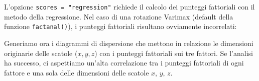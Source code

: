 \documentclass[
  11pt,
]{krantz}
\makeatletter
\newenvironment{Shaded}{\begin{snugshade}}{\end{snugshade}}
\newcommand{\CommentTok}[1]{\textcolor[rgb]{0.37,0.37,0.37}{\textit{#1}}}
\newcommand{\DecValTok}[1]{\textcolor[rgb]{0.06,0.06,0.06}{#1}}
\newcommand{\FunctionTok}[1]{\textcolor[rgb]{0,0,0}{#1}}
\newcommand{\NormalTok}[1]{#1}
\newcommand{\SpecialCharTok}[1]{\textcolor[rgb]{0,0,0}{#1}}
\newenvironment{kframe}{%
\medskip{}
\setlength{\fboxsep}{.8em}
 \def\at@end@of@kframe{}%
 \ifinner\ifhmode%
  \def\at@end@of@kframe{\end{minipage}}%
  \begin{minipage}{\columnwidth}%
 \fi\fi%
 \def\FrameCommand##1{\hskip\@totalleftmargin \hskip-\fboxsep
 \colorbox{shadecolor}{##1}\hskip-\fboxsep
     \hskip-\linewidth \hskip-\@totalleftmargin \hskip\columnwidth}%
 \MakeFramed {\advance\hsize-\width
   \@totalleftmargin\z@ \linewidth\hsize
   \@setminipage}}%
 {\par\unskip\endMakeFramed%
 \at@end@of@kframe}
\renewenvironment{Shaded}{\begin{kframe}}{\end{kframe}}
\theoremstyle{definition}
\theoremstyle{definition}
\theoremstyle{definition}
\theoremstyle{definition}
\theoremstyle{remark}
\makeatother
\begin{document}
L'opzione \texttt{scores\ =\ "regression"} richiede il calcolo dei punteggi fattoriali con il metodo della regressione. Nel caso di una rotazione Varimax (default della funzione \texttt{factanal()}), i punteggi fattoriali risultano ovviamente incorrelati:

\begin{Shaded}
\end{Shaded}

Generiamo ora i diagrammi di dispersione che mettono in relazione le dimensioni originarie delle scatole (\(x, y, z\)) con i punteggi fattoriali sui tre fattori. Se l'analisi ha successo, ci aspettiamo un'alta correlazione tra i punteggi fattoriali di ogni fattore e una sola delle dimensioni delle scatole \(x\), \(y\), \(z\).
\end{document}
